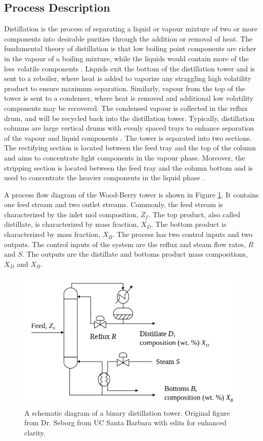 \subsection{Process Description}
Distillation is the process of separating a liquid or vapour mixture of two or more components into desirable purities through the addition or removal of heat. The fundamental theory of distillation is that low boiling point components are richer in the vapour of a boiling mixture, while the liquids would contain more of the less volatile components \cite{distillation_intro}.  Liquids exit the bottom of the distillation tower and is sent to a reboiler, where heat is added to vaporize any straggling high volatility product to ensure maximum separation. Similarly, vapour from the top of the tower is sent to a condenser, where heat is removed and additional low volatility components may be recovered. The condensed vapour is collected in the reflux drum, and will be recycled back into the distillation tower. Typically, distillation columns are large vertical drums with evenly spaced trays to enhance separation of the vapour and liquid components \cite{mpc_for_distillation_tower}.  The tower is separated into two sections.  The rectifying section is located between the feed tray and the top of the column and aims to concentrate light components in the vapour phase.  Moreover, the stripping section is located between the feed tray and the column bottom and is used to concentrate the heavier components in the liquid phase \cite{henry_distillation}.

A process flow diagram of the Wood-Berry tower is shown in Figure \ref{fig: woodberry}.  It contains one feed stream and two outlet streams.  Commonly, the feed stream is characterized by the inlet mol composition, $Z_f$.  The top product, also called distillate, is characterized by mass fraction, $X_D$.  The bottom product is characterized by mass fraction, $X_B$.  The process has two control inputs and two outputs. The control inputs of the system are the reflux and steam flow rates, $R$ and $S$.  The outputs are the distillate and bottoms product mass compositions, $X_D$ and $X_B$.

\begin{figure}[h]
    \centering
    \includegraphics[scale=0.45]{images/woodberry.png}
    \caption{A schematic diagram of a binary distillation tower.  Original figure from Dr. Seborg from UC Santa Barbara with edits for enhanced clarity.}
    \label{fig: woodberry}
\end{figure}

